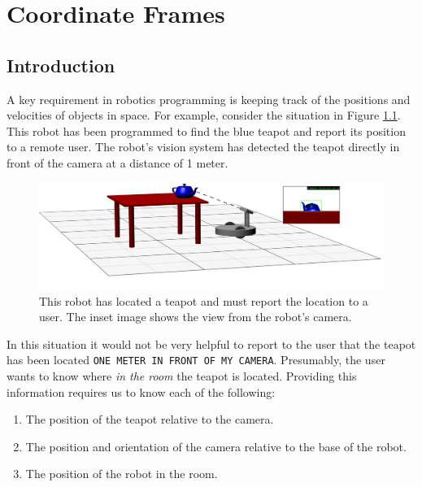 
\chapter{Coordinate Frames}

\section{Introduction}

A key requirement in robotics programming is keeping track of the
positions and velocities of objects in space.  For example, consider
the situation in Figure \ref{fig:robot_w_inset}.  This robot has been
programmed to find the blue teapot and report its position to a remote
user.  The robot's vision system has detected the teapot directly in
front of the camera at a distance of 1 meter.

\begin{figure}
\begin{center}
\includegraphics[]{frames/figs/robot_w_inset.png}
\end{center}
\caption{This robot has located a teapot and must report the location
  to a user.  The inset image shows the view from the robot's camera.}
\label{fig:robot_w_inset}
\end{figure}

In this situation it would not be very helpful to report to the user
that the teapot has been located \texttt{ONE METER IN FRONT OF MY
  CAMERA}.  Presumably, the user wants to know where \emph{in the
  room} the teapot is located. Providing this information requires us
to know each of the following:
\begin{enumerate}
\item{The position of the teapot relative to the camera. }
\item{The position and orientation of the camera relative to the base
  of the robot.}
\item{The position of the robot in the room.}
\end{enumerate}

